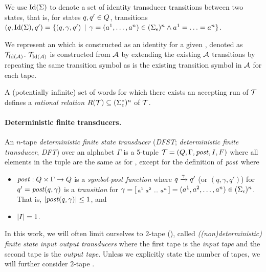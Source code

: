 We use $\text{Id}(\Sigma)$ to denote a set of identity transducer transitions between two states, that is, for states $q, q' \in Q$, transitions
$(q, \text{Id}(\Sigma), q') = \{ (q, \gamma, q') \,\mid\, \gamma = (a^1, \ldots, a^n) \in (\Sigma_\epsilon)^n \land a^1 = \ldots = a^n \}$.

We represent an \nft which is constructed as an identity \nft for a given \nfa, denoted as $\mathcal{T}_{\text{Id}(\mathcal{A})}$.
$\mathcal{T}_{\text{Id}(\mathcal{A})}$ is constructed from $\mathcal{A}$ by extending the existing $\mathcal{A}$ transitions by repeating the same transition symbol as is the existing transition symbol in $\mathcal{A}$ for each tape.

A (potentially infinite) set of words for which there exists an accepting run of $\mathcal{T}$ defines a \emph{rational relation} $R(\mathcal{T}) \subseteq (\Sigma_\epsilon^*)^n$ of \nft $\mathcal{T}$.

\paragraph{Deterministic finite transducers.}
An $n$-tape \emph{deterministic finite state transducer} (\emph{DFST}; \emph{deterministic finite transducer}, \emph{DFT}) over an alphabet $\Gamma$ is a 5-tuple $\mathcal{T} = (Q, \Gamma, \mathit{post}, I, F)$ where all elements in the tuple are the same as for \nft, except for the definition of $\mathit{post}$ where
\begin{itemize}
    \item $\mathit{post}: Q \times \Gamma \rightarrow Q$ is a \emph{symbol-post function} where ${q} \xrightarrow{{\gamma}} {q'}$ (or $(q, \gamma, q')$) for $q' = \mathit{post}(q, \gamma)$ is a \emph{transition} for $\gamma = \begin{bsmallmatrix} a^1 & a^2 & \ldots & a^n\end{bsmallmatrix} = (a^1, a^2, \ldots, a^n) \in (\Sigma_\epsilon)^n$. That is, $|\mathit{post}(q, \gamma)| \leq 1$, and
    \item $|I| = 1$.
\end{itemize}


In this work, we will often limit ourselves to $2$-tape \nfts (\dfts), called \emph{((non)deterministic) finite state input output transducers} where the first tape is the \emph{input tape} and the second tape is the \emph{output tape}.
Unless we explicitly state the number of tapes, we will further consider $2$-tape \nfts.

